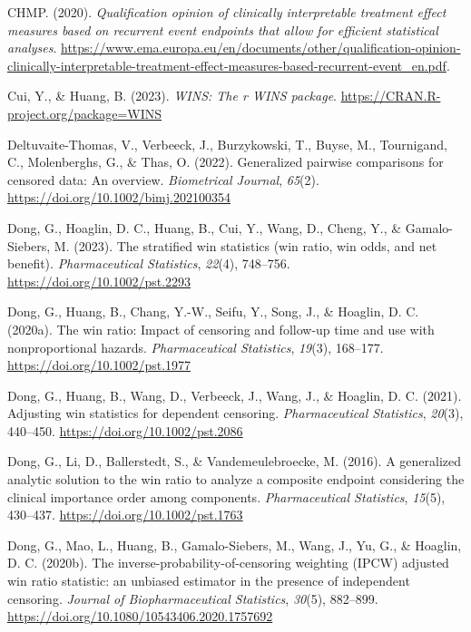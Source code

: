 \documentclass[
  letterpaper,
  DIV=11,
  numbers=noendperiod]{scrreprt}
\newlength{\cslhangindent}
\newlength{\cslentryspacingunit} %
\newenvironment{CSLReferences}[2] %
 {%
  \setlength{\parindent}{0pt}
  \ifodd #1
  \let\oldpar\par
  \def\par{\hangindent=\cslhangindent\oldpar}
  \fi
  \setlength{\parskip}{#2\cslentryspacingunit}
 }%
 {}
\begin{document}
\begin{CSLReferences}{1}{0}
\leavevmode{}%
CHMP. (2020). \emph{Qualification opinion of clinically interpretable
treatment effect measures based on recurrent event endpoints that allow
for efficient statistical analyses}.
\url{https://www.ema.europa.eu/en/documents/other/qualification-opinion-clinically-interpretable-treatment-effect-measures-based-recurrent-event_en.pdf}.

\leavevmode{}%
Cui, Y., \& Huang, B. (2023). \emph{WINS: The r WINS package}.
\url{https://CRAN.R-project.org/package=WINS}

\leavevmode{}%
Deltuvaite-Thomas, V., Verbeeck, J., Burzykowski, T., Buyse, M.,
Tournigand, C., Molenberghs, G., \& Thas, O. (2022). Generalized
pairwise comparisons for censored data: An overview. \emph{Biometrical
Journal}, \emph{65}(2). \url{https://doi.org/10.1002/bimj.202100354}

\leavevmode{}%
Dong, G., Hoaglin, D. C., Huang, B., Cui, Y., Wang, D., Cheng, Y., \&
Gamalo-Siebers, M. (2023). The stratified win statistics (win ratio, win
odds, and net benefit). \emph{Pharmaceutical Statistics}, \emph{22}(4),
748--756. \url{https://doi.org/10.1002/pst.2293}

\leavevmode{}%
Dong, G., Huang, B., Chang, Y.-W., Seifu, Y., Song, J., \& Hoaglin, D.
C. (2020a). The win ratio: Impact of censoring and follow{-}up time and
use with nonproportional hazards. \emph{Pharmaceutical Statistics},
\emph{19}(3), 168--177. \url{https://doi.org/10.1002/pst.1977}

\leavevmode{}%
Dong, G., Huang, B., Wang, D., Verbeeck, J., Wang, J., \& Hoaglin, D. C.
(2021). Adjusting win statistics for dependent censoring.
\emph{Pharmaceutical Statistics}, \emph{20}(3), 440--450.
\url{https://doi.org/10.1002/pst.2086}

\leavevmode{}%
Dong, G., Li, D., Ballerstedt, S., \& Vandemeulebroecke, M. (2016). A
generalized analytic solution to the win ratio to analyze a composite
endpoint considering the clinical importance order among components.
\emph{Pharmaceutical Statistics}, \emph{15}(5), 430--437.
\url{https://doi.org/10.1002/pst.1763}

\leavevmode{}%
Dong, G., Mao, L., Huang, B., Gamalo-Siebers, M., Wang, J., Yu, G., \&
Hoaglin, D. C. (2020b). The inverse-probability-of-censoring weighting
(IPCW) adjusted win ratio statistic: an unbiased estimator in the
presence of independent censoring. \emph{Journal of Biopharmaceutical
Statistics}, \emph{30}(5), 882--899.
\url{https://doi.org/10.1080/10543406.2020.1757692}


\end{CSLReferences}
\end{document}
